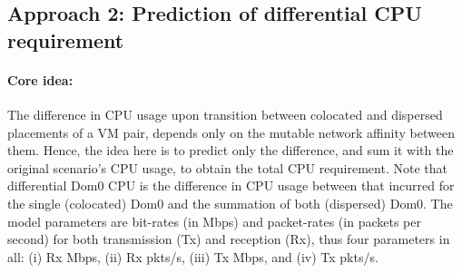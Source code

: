 \subsection{Approach 2: Prediction of differential CPU requirement}
\paragraph{Core idea: }
The difference in CPU usage upon transition between
colocated and dispersed placements of a VM pair, depends only on the mutable
network affinity between them. Hence, the idea here is to predict only
the difference, and sum it with the original scenario's CPU usage, to
obtain the total CPU requirement.
Note that differential Dom0 CPU is the difference in CPU 
usage between that incurred for the single (colocated) Dom0 and
the summation of both (dispersed) Dom0.
The model parameters are bit-rates (in Mbps) and packet-rates (in packets 
per second) for both transmission (Tx) and reception (Rx), thus four parameters
in all: (i) Rx Mbps, (ii) Rx pkts/s, (iii) Tx Mbps, and (iv) Tx pkts/s. 


